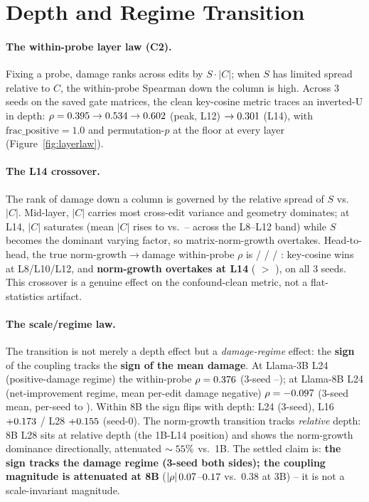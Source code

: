 \section{Depth and Regime Transition}
\label{sec:regime}

\paragraph{The within-probe layer law (C2).} Fixing a probe, damage ranks
across edits by $S\cdot|C|$; when $S$ has limited spread relative to $C$, the
within-probe Spearman down the column is high. Across 3 seeds on the saved
gate matrices, the clean key-cosine metric traces an inverted-U in depth:
$\rho = 0.395{}\rightarrow0.534{}\rightarrow
0.602{}$ (peak, L12) $\rightarrow0.301{}$ (L14), with
$\text{frac\_positive}=1.0$ and permutation-$p$ at the \gPermFloor{} floor at
every layer (Figure~\ref{fig:layerlaw}).

\paragraph{The L14 crossover.} The rank of damage down a column is governed by
the relative spread of $S$ vs.\ $|C|$. Mid-layer, $|C|$ carries most
cross-edit variance and geometry dominates; at L14, $|C|$ saturates (mean
$|C|$ rises to \meanCLfourteen{} vs.\ \meanCbandLo{}--\meanCbandHi{} across the
L8--L12 band) while $S$ becomes the dominant varying factor, so
matrix-norm-growth overtakes. Head-to-head, the true norm-growth$\rightarrow$damage
within-probe $\rho$ is \ngWithinLeight{} / \ngWithinLten{} / \ngWithinLtwelve{}
/ \ngWithinLfourteen{}: key-cosine wins at L8/L10/L12, and \textbf{norm-growth
overtakes at L14} (\ngWithinLfourteen{} $>$ \gWithinLfourteen{}), on all 3
seeds. This crossover is a genuine effect on the confound-clean metric, not a
flat-statistics artifact.

\paragraph{The scale/regime law.} The transition is not merely a depth effect
but a \emph{damage-regime} effect: the \textbf{sign} of the coupling tracks the
\textbf{sign of the mean damage}. At Llama-3B L24 (positive-damage regime) the
within-probe $\rho = 0.376{}$ (3-seed \regimeThreeBLo{}--\regimeThreeBHi{});
at Llama-8B L24 (net-improvement regime, mean per-edit damage negative)
$\rho = -0.097{}$ (3-seed mean, per-seed \regimeEightBHi{} to
\regimeEightBLo{}). Within 8B the sign flips with depth: L24 \regimeEightB{}
(3-seed), L16 $+0.173{}$ / L28 $+0.155{}$
(seed-0). The norm-growth transition tracks \emph{relative} depth: 8B L28 sits
at \relDepthEightBLtwentyeight{} relative depth (the 1B-L14 position) and shows
the norm-growth dominance directionally, attenuated $\sim55\%$ vs.\ 1B.
The settled claim is: \textbf{the sign tracks the damage regime (3-seed both
sides); the coupling magnitude is attenuated at 8B}
($|\rho|\,0.07{}$--$0.17{}$ vs.\ $0.38$ at 3B) -- it is
not a scale-invariant magnitude.




